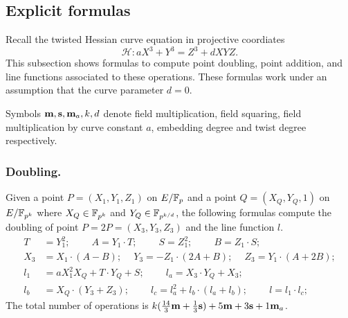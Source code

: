 
\subsection{Explicit formulas}

Recall the twisted Hessian curve equation in projective coordiates
$$ \mathcal{H}: a X^3 + Y^3 = Z^3 + d X Y Z. $$
This subsection shows formulas to compute point doubling, point addition, and line functions associated to these operations.
These formulas work under an assumption that the curve parameter $d = 0$.

Symbols $\textbf{m}, \textbf{s}, \textbf{m}_{a}, k, d$ denote
field multiplication,
field squaring,
field multiplication by curve constant $a$,
embedding degree and
twist degree respectively.

\subsubsection{Doubling.}
Given a point $P = (X_1,Y_1,Z_1)$ on $E/\mathbb{F}_{p}$ and a point $Q = (X_Q,Y_Q,1)$ on $E/\mathbb{F}_{p^{k}}$
where $X_Q \in \mathbb{F}_{p^{k}}$ and $Y_Q \in \mathbb{F}_{p^{k/d}}$,
the following formulas compute the doubling of point $P = 2P = (X_3,Y_3,Z_3)$ and the line function $l$.
\begin{align*}
T &= Y_1^2;\	\qquad	A = Y_1 \cdot T;\	\qquad
S = Z_1 ^ 2;\	\qquad	B = Z_1 \cdot S;\\
X_3 &= X_1 \cdot (A - B);\	\quad
Y_3 = -Z_1 \cdot (2A + B);\	\quad
Z_3 = Y_1 \cdot (A + 2B);\\
l_1 &= a X_1^2 X_Q + T \cdot Y_Q + S;\	\qquad
l_a = X_3 \cdot Y_Q + X_3;	\\
l_b &= X_Q \cdot (Y_3 + Z_3);\			\qquad
l_c = l_a^2 + l_b \cdot (l_a + l_b);\		\qquad
l = l_1 \cdot l_c;
\end{align*}
The total number of operations is
$ k(\frac{14}{3}\textbf{m} + \frac{1}{3}\textbf{s}) + 5\textbf{m} +3\textbf{s} + 1\textbf{m}_a$.


